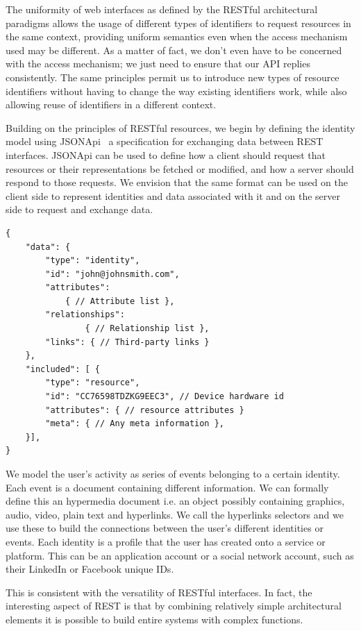 The uniformity of web interfaces as defined by the RESTful architectural paradigms allows the usage of different types of identifiers to request resources in the same context, providing uniform semantics even when the access mechanism used may be different. As a matter of fact, we don't even have to be concerned with the access mechanism; we just need to ensure that our API replies consistently. The same principles permit us to introduce new types of resource identifiers without having to change the way existing identifiers work, while also allowing reuse of identifiers in a different context.

Building on the principles of RESTful resources, we begin by defining the identity model using JSONApi~\cite{Jsonapi} a specification for exchanging data between REST interfaces. JSONApi can be used to define how a client should request that resources or their representations be fetched or modified, and how a server should respond to those requests. We envision that the same format can be used on the client side to represent identities and data associated with it and on the server side to request and exchange data.

\begin{lstlisting}
{
    "data": {
        "type": "identity",
        "id": "john@johnsmith.com",
        "attributes":
            { // Attribute list },
        "relationships":
                { // Relationship list },
        "links": { // Third-party links }
    },
    "included": [ {
        "type": "resource",
        "id": "CC76598TDZKG9EEC3", // Device hardware id
        "attributes": { // resource attributes }
        "meta": { // Any meta information },
    }],
}
\end{lstlisting}

We model the user's activity as series of events belonging to a certain identity. Each event is a document containing different information. We can formally define this an hypermedia document i.e. an object possibly containing graphics, audio, video, plain text and hyperlinks. We call the hyperlinks selectors and we use these to build the connections between the user's different identities or events. Each identity is a profile that the user has created onto a service or platform. This can be an application account or a social network account, such as their LinkedIn or Facebook unique IDs.

This is consistent with the versatility of RESTful interfaces. In fact, the interesting aspect of REST is that by combining relatively simple architectural elements it is possible to build entire systems with complex functions.

